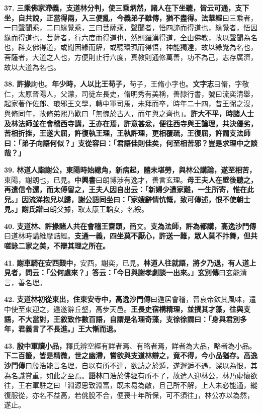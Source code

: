 \textbf{37.} \textbf{三乘佛家滯義，支道林分判，使三乘炳然，諸人在下坐聽，皆云可通，支下坐，自共說，正當得兩，入三便亂，今義弟子雖傳，猶不盡得。}{\footnotesize \textbf{法華經}曰三乘者，一曰聲聞乘，二曰緣覺乘，三曰菩薩乘，聲聞者，悟四諦而得道也，緣覺者，悟因緣而得道也，菩薩者，行六度而得道也，然則羅漢得道，全由佛教，故以聲聞為名也，辟支佛得道，或聞因緣而解，或聽環珮而得悟，神能獨達，故以緣覺為名也，菩薩者，大道之人也，方便則止行六度，真教則通修萬善，功不為己，志存廣濟，故以大道為名也。}

\textbf{38.} \textbf{許掾}{\footnotesize 詢也。}\textbf{年少時，人以比王苟子，}{\footnotesize 苟子，王脩小字也。\textbf{文字志}曰脩，字敬仁，太原晉陽人，父濛，司徒左長史，脩明秀有美稱，善隸行書，號曰流奕清舉，起家著作佐郎、琅邪王文學，轉中軍司馬，未拜而卒，時年二十四，昔王弼之沒，與脩同年，故脩弟熙乃歎曰「無愧於古人，而年與之齊也」。}\textbf{許大不平，時諸人士及林法師並在會稽西寺講，王亦在焉，許意甚忿，便往西寺與王論理，共決優劣，苦相折挫，王遂大屈，許復執王理，王執許理，更相覆疏，王復屈，許謂支法師曰：「弟子向語何似？」支從容曰：「君語佳則佳矣，何至相苦邪？豈是求理中之談哉？」}

\textbf{39.} \textbf{林道人詣謝公，東陽時始總角，新病起，體未堪勞，與林公講論，遂至相苦，}{\footnotesize 東陽，謝朗也，已見。\textbf{中興書}曰朗博涉有逸才，善言玄理。}\textbf{母王夫人在壁後聽之，再遣信令還，而太傅留之，王夫人因自出云：「新婦少遭家難，一生所寄，惟在此兒。」因流涕抱兒以歸，謝公語同坐曰：「家嫂辭情忼慨，致可傳述，恨不使朝士見。」}{\footnotesize \textbf{謝氏譜}曰朗父據，取太康王韜女，名綏。}

\textbf{40.} \textbf{支道林、許掾諸人共在會稽王齋頭，}{\footnotesize 簡文。}\textbf{支為法師，許為都講，}{\footnotesize \textbf{高逸沙門傳}曰道林時講維摩詰經。}\textbf{支通一義，四坐莫不厭心，許送一難，眾人莫不抃舞，但共嗟詠二家之美，不辯其理之所在。}

\textbf{41.} \textbf{謝車騎在安西艱中，}{\footnotesize 安西，謝奕，已見。}\textbf{林道人往就語，將夕乃退，有人道上見者，問云：「公何處來？」答云：「今日與謝孝劇談一出來。」}{\footnotesize \textbf{玄別傳}曰玄能清言，善名理。}

\textbf{42.} \textbf{支道林初從東出，住東安寺中，}{\footnotesize \textbf{高逸沙門傳}曰遁居會稽，晉哀帝欽其風味，遣中使至東迎之，遁遂辭丘壑，高步天邑。}\textbf{王長史宿構精理，並撰其才藻，往與支語，不大當對，王敘致作數百語，自謂是名理奇藻，支徐徐謂曰：「身與君別多年，君義言了不長進。」王大慚而退。}

\textbf{43.} \textbf{殷中軍讀小品，}{\footnotesize 釋氏辨空經有詳者焉、有略者焉，詳者為大品，略者為小品。}\textbf{下二百籤，皆是精微，世之幽滯，嘗欲與支道林辯之，竟不得，今小品猶存。}{\footnotesize \textbf{高逸沙門傳}曰殷浩能言名理，自以有所不達，欲訪之於遁，遂邂逅不遇，深以為恨，其為名識賞重，如此之至焉。\textbf{語林}曰浩於佛經有所不了，故遣人迎林公，林乃虛懷欲往，王右軍駐之曰「淵源思致淵富，既未易為敵，且己所不解，上人未必能通，縱復服從，亦名不益高，若佻脫不合，便喪十年所保，可不須往」，林公亦以為然，遂止。}

